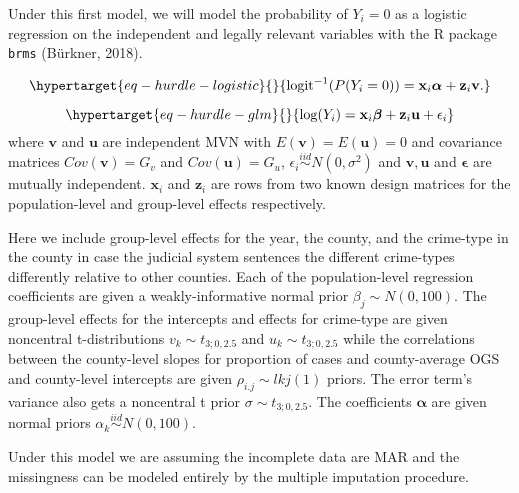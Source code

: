 \documentclass[
  letterpaper,
  DIV=11,
  numbers=noendperiod]{scrartcl}
\begin{document}
Under this first model, we will model the probability of \(Y_i = 0\) as
a logistic regression on the independent and legally relevant variables
with the R package \texttt{brms} (Bürkner, 2018).

\begin{equation}\protect\hypertarget{eq-hurdle-logistic}{}{
\mathrm{logit}^{-1}(P(Y_i = 0)) = \mathbf{x}_i \boldsymbol{\alpha} + \mathbf{z}_i \mathbf{v}.
}\label{eq-hurdle-logistic}\end{equation}

\begin{equation}\protect\hypertarget{eq-hurdle-glm}{}{
\log(Y_i) = \mathbf{x}_i \boldsymbol{\beta} + \mathbf{z}_i \mathbf{u} + \epsilon_i
}\label{eq-hurdle-glm}\end{equation} where \(\mathbf{v}\) and
\(\mathbf{u}\) are independent MVN with
\(E(\mathbf{v}) = E(\mathbf{u}) = 0\) and covariance matrices
\(Cov(\mathbf{v}) = G_v\) and \(Cov(\mathbf{u}) = G_u\),
\(\epsilon_i \overset{iid}{\sim} N(0, \sigma^2)\) and
\(\mathbf{v}, \mathbf{u}\) and \(\boldsymbol{\epsilon}\) are mutually
independent. \(\mathbf{x}_i\) and \(\mathbf{z}_i\) are rows from two
known design matrices for the population-level and group-level effects
respectively.

Here we include group-level effects for the year, the county, and the
crime-type in the county in case the judicial system sentences the
different crime-types differently relative to other counties. Each of
the population-level regression coefficients are given a
weakly-informative normal prior \(\beta_j \sim N(0, 100).\) The
group-level effects for the intercepts and effects for crime-type are
given noncentral t-distributions \(v_k \sim t_{3; 0, 2.5}\) and
\(u_k \sim t_{3; 0, 2.5}\) while the correlations between the
county-level slopes for proportion of cases and county-average OGS and
county-level intercepts are given \(\rho_{i.j} \sim lkj(1)\) priors. The
error term's variance also gets a noncentral t prior
\(\sigma \sim t_{3; 0, 2.5}.\) The coefficients \(\boldsymbol{\alpha}\)
are given normal priors \(\alpha_k \overset{iid}{\sim} N(0, 100).\)

Under this model we are assuming the incomplete data are MAR and the
missingness can be modeled entirely by the multiple imputation
procedure.
\end{document}
